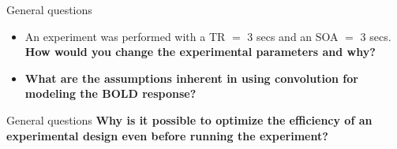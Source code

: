 \documentclass{beamer}
\begin{document}
\begin{frame}{General questions}
  \begin{itemize}
    \item An experiment was performed with a TR $=$ 3 secs and an SOA $=$ 3 secs. \textbf{How would you change the experimental parameters and why?}


    \bigskip
    \item \textbf{What are the assumptions inherent in using convolution for modeling the BOLD response?}

  \end{itemize}
\end{frame}

\begin{frame}{General questions}
  \textbf{Why is it possible to optimize the efficiency of an experimental design even before running the experiment?}

%   
%   

\end{frame}
\end{document}
